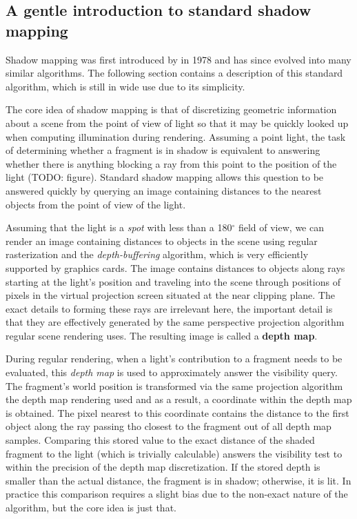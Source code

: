 \subsection{A gentle introduction to standard shadow mapping}

Shadow mapping was first introduced by \citet{Williams78castingcurved} in 1978 and has since evolved into many similar algorithms. The following section contains a description of this standard algorithm, which is still in wide use due to its simplicity.

The core idea of shadow mapping is that of discretizing geometric information about a scene from the point of view of  light so that it may be quickly looked up when computing illumination during rendering. Assuming a point light, the task of determining whether a fragment is in shadow is equivalent to answering whether there is anything blocking a ray from this point to the position of the light (TODO: figure). Standard shadow mapping allows this question to be answered quickly by querying an image containing distances to the nearest objects from the point of view of the light.

Assuming that the light is a \emph{spot} with less than a 180$^\circ$ field of view, we can render an image containing distances to objects in the scene using regular rasterization and the \emph{depth-buffering} algorithm, which is very efficiently supported by graphics cards. The image contains distances to objects along rays starting at the light's position and traveling into the scene through positions of pixels in the virtual projection screen situated at the near clipping plane. The exact details to forming these rays are irrelevant here, the important detail is that they are effectively generated by the same perspective projection algorithm regular scene rendering uses. The resulting image is called a \textbf{depth map}.

During regular rendering, when a light's contribution to a fragment needs to be evaluated, this \emph{depth map} is used to approximately answer the visibility query. The fragment's world position is transformed via the same projection algorithm the depth map rendering used and as a result, a coordinate within the depth map is obtained. The pixel nearest to this coordinate contains the distance to the first object along the ray passing tho closest to the fragment out of all depth map samples. Comparing this stored value to the exact distance of the shaded fragment to the light (which is trivially calculable) answers the visibility test to within the precision of the depth map discretization. If the stored depth is smaller than the actual distance, the fragment is in shadow; otherwise, it is lit. In practice this comparison requires a slight bias due to the non-exact nature of the algorithm, but the core idea is just that.

